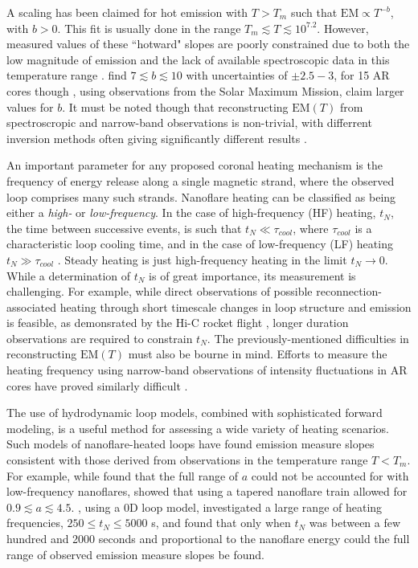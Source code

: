 \documentclass[preprint,linenumbers]{aastex}
\begin{document}
	\par A scaling has been claimed for hot emission with $T>T_m$ such that $\mathrm{EM}\propto T^{-b}$, with $b>0$. This fit is usually done in the range $T_m\lesssim T\lesssim10^{7.2}$. However, measured values of these ``hotward" slopes are poorly constrained due to both the low magnitude of emission and the lack of available spectroscopic data in this temperature range \citep{winebarger_defining_2012}. \citet{warren_systematic_2012} find $7\lesssim b\lesssim10$ with uncertainties of $\pm2.5-3$, for 15 AR cores though \citet{del_zanna_elemental_2014}, using observations from the Solar Maximum Mission, claim larger values for $b$. It must be noted though that reconstructing $\mathrm{EM}(T)$ from spectroscropic and narrow-band observations is non-trivial, with differrent inversion methods often giving significantly different results \citep{landi_monte_2012,guennou_can_2013,aschwanden_benchmark_2015}.
	\par An important parameter for any proposed coronal heating mechanism is the frequency of energy release along a single magnetic strand, where the observed loop comprises many such strands. Nanoflare heating can be classified as being either a \textit{high-} or \textit{low-frequency}. In the case of high-frequency (HF) heating, $t_N$, the time between successive events, is such that $t_N\ll\tau_{cool}$, where $\tau_{cool}$ is a characteristic loop cooling time, and in the case of low-frequency (LF) heating $t_N\gg\tau_{cool}$ \citep{mulu-moore_can_2011,warren_constraints_2011,bradshaw_diagnosing_2012,reep_diagnosing_2013,cargill_modelling_2015}. Steady heating is just high-frequency heating in the limit $t_N\to0$. While a determination of $t_N$ is of great importance, its measurement is challenging. For example, while direct observations of possible reconnection-associated heating through short timescale changes in loop structure and emission is feasible, as demonsrated by the Hi-C rocket flight \citep{cirtain_energy_2013,cargill_solar_2013}, longer duration observations are required to constrain $t_N$. The previously-mentioned difficulties in reconstructing $\mathrm{EM}(T)$ must also be bourne in mind. Efforts to measure the heating frequency using narrow-band observations of intensity fluctuations in AR cores  have proved similarly difficult \citep{ugarte-urra_determining_2014}.
	\par The use of hydrodynamic loop models, combined with sophisticated forward modeling, is a useful method for assessing a wide variety of heating scenarios. Such models of nanoflare-heated loops have found emission measure slopes consistent with those derived from observations in the temperature range $T<T_m$. For example, while \citet{bradshaw_diagnosing_2012} found that the full range of $a$ could not be accounted for with low-frequency nanoflares, \citet{reep_diagnosing_2013} showed that using a tapered nanoflare train allowed for $0.9\lesssim a\lesssim4.5$. \citet{cargill_active_2014}, using a 0D loop model, investigated a large range of heating frequencies, $250\le t_N\le5000$ s, and found that only when $t_N$ was between a few hundred and 2000 seconds and proportional to the nanoflare energy could the full range of observed emission measure slopes be found. 
\end{document}

